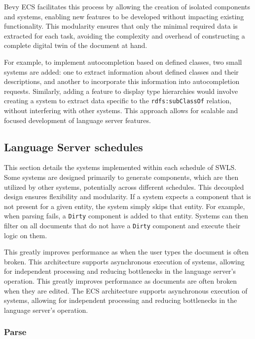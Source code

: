 Bevy ECS facilitates this process by allowing the creation of isolated components and systems, enabling new features to be developed without impacting existing functionality.
This modularity ensures that only the minimal required data is extracted for each task, avoiding the complexity and overhead of constructing a complete digital twin of the document at hand.

For example, to implement autocompletion based on defined classes, two small systems are added:
  one to extract information about defined classes and their descriptions,
  and another to incorporate this information into autocompletion requests. 
Similarly, adding a feature to display type hierarchies would involve creating a system to extract data specific to the \texttt{rdfs:subClassOf} relation, without interfering with other systems.
This approach allows for scalable and focused development of language server features.


\subsection{Language Server schedules}

This section details the systems implemented within each schedule of SWLS.
Some systems are designed primarily to generate components, which are then utilized by other systems, potentially across different schedules.
This decoupled design ensures flexibility and modularity. 
If a system expects a component that is not present for a given entity, the system simply skips that entity.
For example, when parsing fails, a \texttt{Dirty} component is added to that entity.
Systems can then filter on all documents that do not have a \texttt{Dirty} component and execute their logic on them.

This greatly improves performance as when the user types the document is often broken.
This architecture supports asynchronous execution of systems, allowing for independent processing and reducing bottlenecks in the language server’s operation.
This greatly improves performance as documents are often broken when they are edited.
The ECS architecture supports asynchronous execution of systems, allowing for independent processing and reducing bottlenecks in the language server’s operation.

\subsubsection{Parse}

